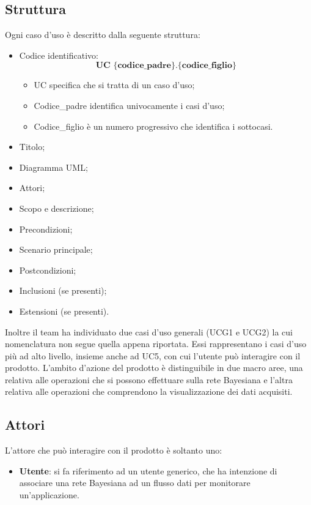 \subsection{Struttura}
Ogni caso d'uso è descritto dalla seguente struttura:
\begin{itemize}
	\item Codice identificativo: $$ \textbf{UC \{codice\_padre\}.\{codice\_figlio\}  } $$
	\begin{itemize}
		\item UC specifica che si tratta di un caso d'uso;
		\item Codice\_padre identifica univocamente i casi d'uso;
		\item Codice\_figlio è un numero progressivo che identifica i sottocasi.
	\end{itemize}
	\item Titolo;
	\item Diagramma UML;
	\item Attori;
	\item Scopo e descrizione;
	\item Precondizioni;
	\item Scenario principale;
	\item Postcondizioni;
	\item Inclusioni (se presenti);
	\item Estensioni (se presenti).
\end{itemize}
\Spazio
Inoltre il team ha individuato due casi d'uso generali (UCG1 e UCG2) la cui nomenclatura non segue quella appena riportata. Essi rappresentano i casi d'uso più ad alto livello, insieme anche ad UC5, con cui l'utente può interagire con il prodotto.
L'ambito d'azione del prodotto è distinguibile in due macro aree, una relativa alle operazioni che si possono effettuare sulla rete Bayesiana e l'altra relativa alle operazioni che comprendono la visualizzazione dei dati acquisiti.

\subsection{Attori}
L'attore che può interagire con il prodotto è soltanto uno:
\begin{itemize}
	\item \textbf{Utente}: si fa riferimento ad un utente generico, che ha intenzione di associare una rete Bayesiana ad un flusso dati per monitorare un'applicazione.
\end{itemize}

